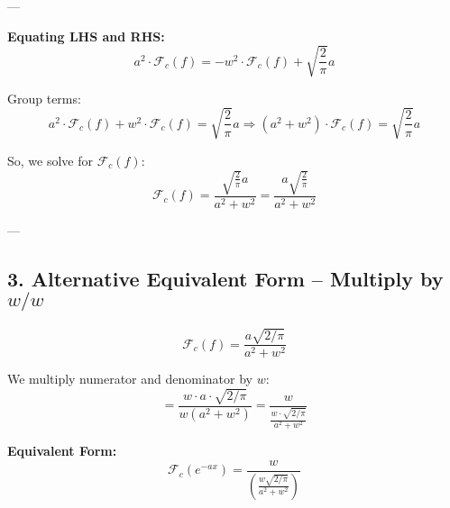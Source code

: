 \documentclass{article}
\begin{document}
---

\textbf{Equating LHS and RHS:}
\[
a^2 \cdot \mathcal{F}_c(f) = -w^2 \cdot \mathcal{F}_c(f) + \sqrt{ \frac{2}{\pi} } a
\]

Group terms:
\[
a^2 \cdot \mathcal{F}_c(f) + w^2 \cdot \mathcal{F}_c(f) = \sqrt{ \frac{2}{\pi} } a
\Rightarrow (a^2 + w^2) \cdot \mathcal{F}_c(f) = \sqrt{ \frac{2}{\pi} } a
\]

So, we solve for \( \mathcal{F}_c(f) \):
\[
\mathcal{F}_c(f) = \frac{ \sqrt{ \frac{2}{\pi} } a }{ a^2 + w^2 }
= \boxed{ \frac{ a \sqrt{ \frac{2}{\pi} } }{ a^2 + w^2 } }
\]

---

\subsection*{3. Alternative Equivalent Form – Multiply by \( w/w \)}

\[
\mathcal{F}_c(f) = \frac{ a \sqrt{2/\pi} }{ a^2 + w^2 }
\]

We multiply numerator and denominator by \( w \):
\[
= \frac{ w \cdot a \cdot \sqrt{2/\pi} }{ w(a^2 + w^2) }
= \frac{w}{ \frac{w \cdot \sqrt{2/\pi} }{ a^2 + w^2 } }
\]

\textbf{Equivalent Form:}
\[
\boxed{
\mathcal{F}_c(e^{-a x}) = \frac{w}{ \left( \frac{ w \sqrt{2/\pi} }{ a^2 + w^2 } \right) }
}
\]
\end{document}
